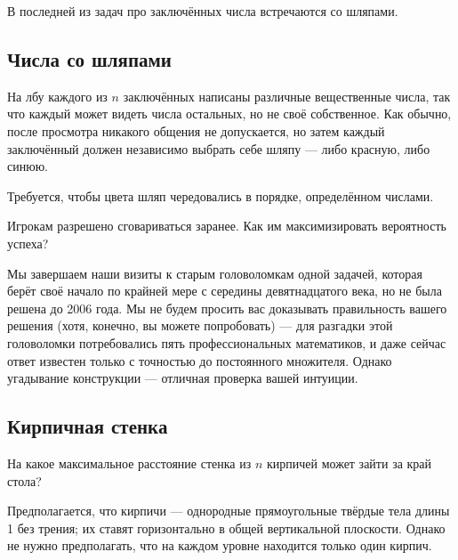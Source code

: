 \medskip

В последней из задач про заключённых числа встречаются со шляпами. 

\subsection*{Числа со шляпами}

На лбу каждого из $n$ заключённых написаны различные вещественные числа, так что каждый может видеть числа остальных, но не своё собственное.
Как обычно, после просмотра никакого общения не допускается, но затем каждый заключённый должен независимо выбрать себе шляпу --- либо красную, либо синюю.

Требуется, чтобы цвета шляп чередовались в порядке, определённом числами.

Игрокам разрешено сговариваться заранее.
Как им максимизировать вероятность успеха?

\medskip

Мы завершаем наши визиты к старым головоломкам одной задачей, которая берёт своё начало по крайней мере с середины девятнадцатого века, но не была решена до 2006 года.
Мы не будем просить вас доказывать правильность вашего решения (хотя, конечно, вы можете попробовать) --- для разгадки этой головоломки потребовались пять профессиональных математиков, и даже сейчас ответ известен только с точностью до постоянного множителя.
Однако угадывание конструкции --- отличная проверка вашей интуиции.

\subsection*{Кирпичная стенка}\label{Кирпичная стенка}

На какое максимальное расстояние стенка из $n$ кирпичей может зайти за край стола?

 Предполагается, что кирпичи --- однородные прямоугольные твёрдые тела длины 1 без трения;
их ставят горизонтально в общей вертикальной плоскости.
Однако не нужно предполагать, что на каждом уровне находится только один кирпич.
